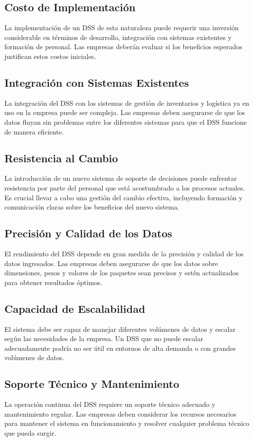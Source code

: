 \documentclass[9pt,a4paper]{rho}
\begin{document}
\subsection{Costo de Implementación}
La implementación de un DSS de esta naturaleza puede requerir una inversión considerable en términos de desarrollo, integración con sistemas existentes y formación de personal. Las empresas deberán evaluar si los beneficios esperados justifican estos costos iniciales.

\subsection{Integración con Sistemas Existentes}
La integración del DSS con los sistemas de gestión de inventarios y logística ya en uso en la empresa puede ser compleja. Las empresas deben asegurarse de que los datos fluyan sin problemas entre los diferentes sistemas para que el DSS funcione de manera eficiente.

\subsection{Resistencia al Cambio}
La introducción de un nuevo sistema de soporte de decisiones puede enfrentar resistencia por parte del personal que está acostumbrado a los procesos actuales. Es crucial llevar a cabo una gestión del cambio efectiva, incluyendo formación y comunicación claras sobre los beneficios del nuevo sistema.

\subsection{Precisión y Calidad de los Datos}
El rendimiento del DSS depende en gran medida de la precisión y calidad de los datos ingresados. Las empresas deben asegurarse de que los datos sobre dimensiones, pesos y valores de los paquetes sean precisos y estén actualizados para obtener resultados óptimos.

\subsection{Capacidad de Escalabilidad}
El sistema debe ser capaz de manejar diferentes volúmenes de datos y escalar según las necesidades de la empresa. Un DSS que no puede escalar adecuadamente podría no ser útil en entornos de alta demanda o con grandes volúmenes de datos.

\subsection{Soporte Técnico y Mantenimiento}
La operación continua del DSS requiere un soporte técnico adecuado y mantenimiento regular. Las empresas deben considerar los recursos necesarios para mantener el sistema en funcionamiento y resolver cualquier problema técnico que pueda surgir.
\end{document}
